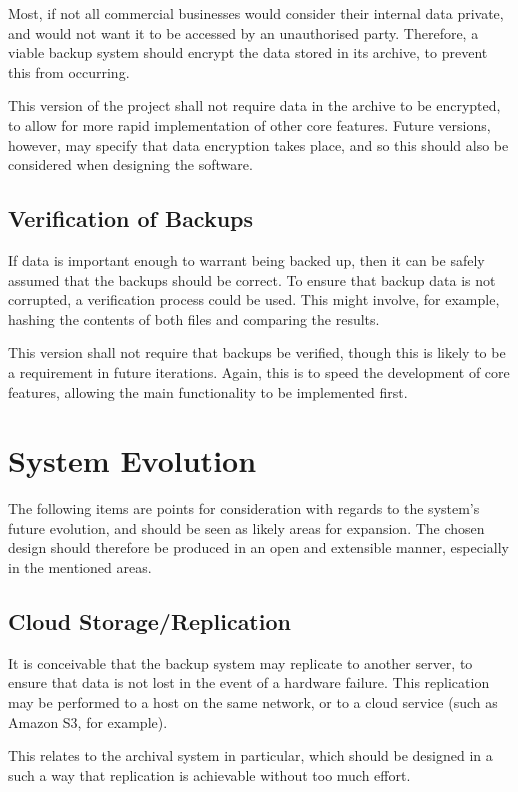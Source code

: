 Most, if not all commercial businesses would consider their internal data
private, and would not want it to be accessed by an unauthorised party.
Therefore, a viable backup system should encrypt the data stored in its
archive, to prevent this from occurring.

This version of the project shall not require data in the archive to be
encrypted, to allow for more rapid implementation of other core features.
Future versions, however, may specify that data encryption takes place, and so
this should also be considered when designing the software.

\subsection{Verification of Backups}

If data is important enough to warrant being backed up, then it can be safely
assumed that the backups should be correct. To ensure that backup data is not
corrupted, a verification process could be used. This might involve, for
example, hashing the contents of both files and comparing the results.

This version shall not require that backups be verified, though this is likely
to be a requirement in future iterations. Again, this is to speed the
development of core features, allowing the main functionality to be implemented
first.

\section{System Evolution}
\label{sec:specification-evolution}

The following items are points for consideration with regards to the system's
future evolution, and should be seen as likely areas for expansion. The chosen
design should therefore be produced in an open and extensible manner,
especially in the mentioned areas.

\subsection{Cloud Storage/Replication}

It is conceivable that the backup system may replicate to another server, to
ensure that data is not lost in the event of a hardware failure. This
replication may be performed to a host on the same network, or to a cloud
service (such as Amazon S3, for example).

This relates to the archival system in particular, which should be designed in
a such a way that replication is achievable without too much effort.

